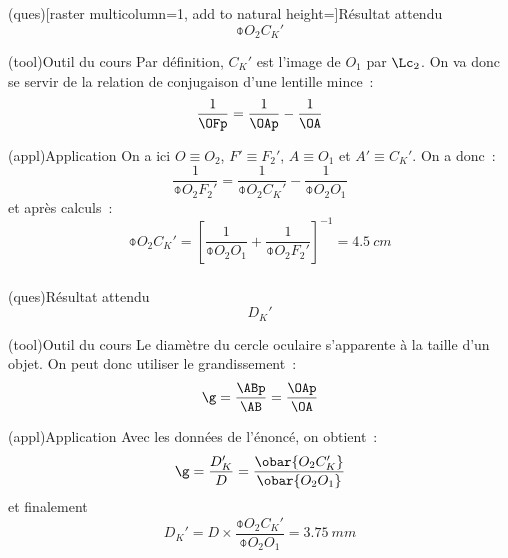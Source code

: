 \documentclass[../../main/main.tex]{subfiles}
\begin{document}
{	\subsubsection{}

	\begin{tcbraster}[raster columns=6, raster equal height=rows]
		\begin{tcolorbox}[blankest, raster multicolumn=3, space to=\myspacee]
			\begin{tcbraster}[raster columns=1]
				\begin{tcb}(ques)[raster multicolumn=1,
							add to natural height=\myspacee]{Résultat attendu}
					$$\obar{O_2C_K'}$$
				\end{tcb}
				\begin{tcb}[raster multicolumn=2](tool){Outil du cours}
					Par définition, $C_K'$ est l'image de $O_1$ par $\Lc_2$. On va
					donc se servir de la relation de conjugaison d'une lentille
					mince~:
					\[ \frac{1}{\OFp} = \frac{1}{\OAp} - \frac{1}{\OA} \]
				\end{tcb}
			\end{tcbraster}
		\end{tcolorbox}
		\begin{tcb}[raster multicolumn=3](appl){Application}
			On a ici $O \equiv O_2$, $F' \equiv F_2'$, $A \equiv O_1$ et $A' \equiv
				C_K'$. On a donc~:
			\[ \frac{1}{\obar{O_2F_2'}} = \frac{1}{\obar{O_2C_K'}} -
				\frac{1}{\obar{O_2O_1}} \]
			et après calculs~:
			\[ \boxed{\obar{O_2C_K'} = \left[ \frac{1}{\obar{O_2O_1}} +
						\frac{1}{\obar{O_2F_2'}}\right]^{-1} = \SI{+4.5}{cm}} \]
		\end{tcb}
	\end{tcbraster}

	\subsubsection{}\label{sssec:k_diam}
	\begin{tcbraster}[raster columns=6, raster equal height=rows]
		\begin{tcolorbox}[blankest, raster multicolumn=3]
			\begin{tcbraster}[raster columns=1]
				\begin{tcb}[raster multicolumn=1](ques){Résultat attendu}
					$$D_K'$$
				\end{tcb}
				\begin{tcb}[raster multicolumn=2](tool){Outil du cours}
					Le diamètre du cercle oculaire s'apparente à la taille d'un
					objet. On peut donc utiliser le grandissement~:
					\[ \g = \frac{\ABp}{\AB} = \frac{\OAp}{\OA} \]
				\end{tcb}
			\end{tcbraster}
		\end{tcolorbox}
		\begin{tcb}[raster multicolumn=3](appl){Application}
			Avec les données de l'énoncé, on obtient~:
			\[ \g = \frac{D_K'}{D} = \frac{\obar{O_2C_K'}}{\obar{O_2O_1}}\]
			et finalement
			\[ \boxed{D_K' = D\times \frac{\obar{O_2C_K'}}{\obar{O_2O_1}} =
					\SI{3.75}{mm}} \]
		\end{tcb}


\end{tcbraster}}
\end{document}
